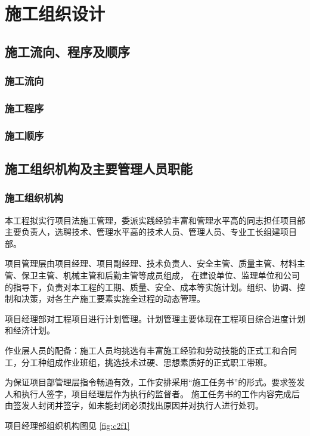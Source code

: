 \section{施工组织设计}
\subsection{施工流向、程序及顺序}
\subsubsection{施工流向}
\subsubsection{施工程序}
\subsubsection{施工顺序}

\subsection{施工组织机构及主要管理人员职能}
\subsubsection{施工组织机构}

本工程拟实行项目法施工管理，委派实践经验丰富和管理水平高的同志担任项目部主要负责人，选聘技术、管理水平高的技术人员、管理人员、专业工长组建项目部。

项目管理层由项目经理、项目副经理、技术负责人、安全主管、质量主管、材料主管、保卫主管、机械主管和后勤主管等成员组成，
在建设单位、监理单位和公司的指导下，负责对本工程的工期、质量、安全、成本等实施计划。组织、协调、控制和决策，对各生产施工要素实施全过程的动态管理。

项目经理部对工程项目进行计划管理。计划管理主要体现在工程项目综合进度计划和经济计划。

作业层人员的配备：施工人员均挑选有丰富施工经验和劳动技能的正式工和合同工，分工种组成作业班组，挑选技术过硬、思想素质好的正式职工带班。

为保证项目部管理层指令畅通有效，工作安排采用“施工任务书”的形式。要求签发人和执行人签字，项目经理层作为执行的监督者。
施工任务书的工作内容完成后由签发人封闭并签字，如未能封闭必须找出原因并对执行人进行处罚。

项目经理部组织机构图见 \ref{fig:c2f1}

